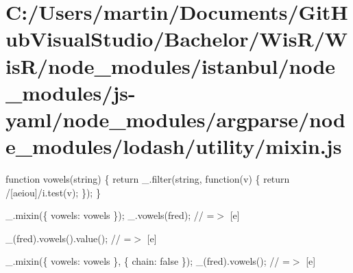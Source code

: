 \hypertarget{_c_1_2_users_2martin_2_documents_2_git_hub_visual_studio_2_bachelor_2_wis_r_2_wis_r_2node_moduleae219ff04fa1a65c0c57ebf49d9aa01d}{}\section{C\+:/\+Users/martin/\+Documents/\+Git\+Hub\+Visual\+Studio/\+Bachelor/\+Wis\+R/\+Wis\+R/node\+\_\+modules/istanbul/node\+\_\+modules/js-\/yaml/node\+\_\+modules/argparse/node\+\_\+modules/lodash/utility/mixin.\+js}
function vowels(string) \{ return \+\_\+.\+filter(string, function(v) \{ return /\mbox{[}aeiou\mbox{]}/i.test(v); \}); \}

\+\_\+.\+mixin(\{ \textquotesingle{}vowels\textquotesingle{}\+: vowels \}); \+\_\+.\+vowels(\textquotesingle{}fred\textquotesingle{}); // =$>$ \mbox{[}\textquotesingle{}e\textquotesingle{}\mbox{]}

\+\_\+(\textquotesingle{}fred\textquotesingle{}).vowels().value(); // =$>$ \mbox{[}\textquotesingle{}e\textquotesingle{}\mbox{]}

\+\_\+.\+mixin(\{ \textquotesingle{}vowels\textquotesingle{}\+: vowels \}, \{ \textquotesingle{}chain\textquotesingle{}\+: false \}); \+\_\+(\textquotesingle{}fred\textquotesingle{}).vowels(); // =$>$ \mbox{[}\textquotesingle{}e\textquotesingle{}\mbox{]}


